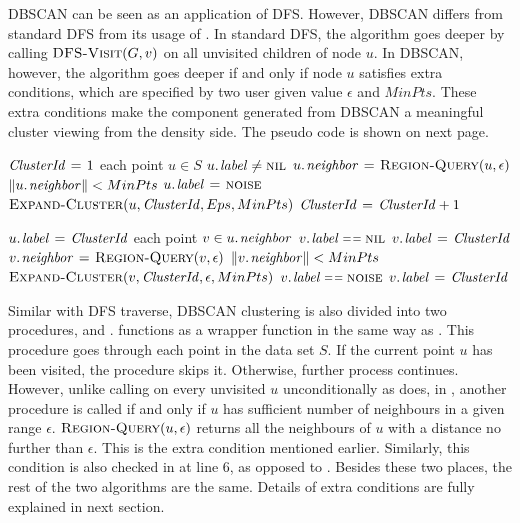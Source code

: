 DBSCAN can be seen as an application of DFS. However, DBSCAN differs from standard DFS from its usage of . In standard DFS, the algorithm goes deeper by calling $\textnormal{\scshape DFS-Visit}(G, v)$ on all unvisited children of node $u$. In DBSCAN, however, the algorithm goes deeper if and only if node $u$ satisfies extra conditions, which are specified by two user given value $\epsilon$ and $MinPts$. These extra conditions make the component generated from DBSCAN a meaningful cluster viewing from the density side. The pseudo code is shown on next page.

\begin{codebox}
\li	$\id{ClusterId} \gets 1$
\li	\For each point $u \in S$
\li	\Do
		\If $\attrib{u}{label} \neq \const{nil}$
\li		\Then	
		\End		
\li			$\attrib{u}{neighbor} \gets \proc{Region-Query}(u, \epsilon)$
\li			\If	$\| \attrib{u}{neighbor} \| < MinPts $
\li				\Then
					$\attrib{u}{label} \gets \const{noise}$
\li			\Else
\li				$\proc{Expand-Cluster}(u, \id{ClusterId}, Eps, MinPts)$
\li				$\id{ClusterId} \gets \id{ClusterId} + 1$
			\End
	\End
\end{codebox}

\begin{codebox}
\li	$\attrib{u}{label} \gets \id{ClusterId}$
\li	\For each point $v \in \attrib{u}{neighbor}$
\li	\Do
		\If $\attrib{v}{label} \isequal \const{nil}$
\li		\Then
			$\attrib{v}{label} \gets \id{ClusterId}$
\li			$\attrib{v}{neighbor} \gets \proc{Region-Query}(v, \epsilon)$
\li				\If	$\| \attrib{v}{neighbor} \| < MinPts $
\li				\Then
					$\proc{Expand-Cluster}(v, \id{ClusterId}, \epsilon, MinPts)$
				\End
\li		\ElseIf $\attrib{v}{label} \isequal \const{noise}$
\li		\Then
			$\attrib{v}{label} \gets \id{ClusterId}$
		\End
	\End
\end{codebox}

Similar with DFS traverse, DBSCAN clustering is also divided into two procedures,  and .  functions as a wrapper function in the same way as . This procedure goes through each point in the data set $S$. If the current point $u$ has been visited, the procedure skips it. Otherwise, further process continues. However, unlike calling  on every unvisited $u$ unconditionally as  does, in , another procedure  is called if and only if $u$ has sufficient number of neighbours in a given range $\epsilon$. $\textnormal{\scshape Region-Query}(u, \epsilon)$ returns all the neighbours of $u$ with a distance no further than $\epsilon$. This is the extra condition mentioned earlier. Similarly, this condition is also checked in  at line 6, as opposed to . Besides these two places, the rest of the two algorithms are the same. Details of extra conditions are fully explained in next section. 

